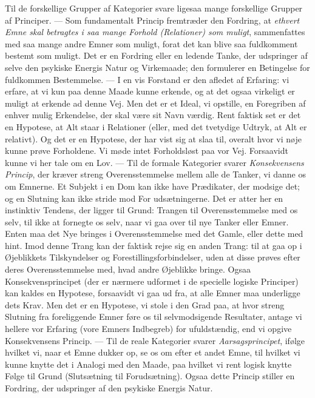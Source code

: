 \documentclass[12pt,a4paper]{book}
\newcommand{\opage}[1]{\marginnote{\footnotesize\textit{[#1]}}}
\begin{document}
Til de forskellige Grupper af Kategorier svare ligesaa mange forskellige Grupper af
Principer. --- Som fundamentalt Princip fremtræder den Fordring, at \emph{ethvert
Emne skal betragtes i saa mange Forhold (Relationer) som muligt}, sammenfattes med
saa mange andre Emner som muligt, forat det kan blive saa fuldkomment bestemt som muligt. Det er en Fordring eller en ledende Tanke, der udspringer af selve den
psykiske Energis Natur og Virkemaade; den formulerer en Betingelse for fuldkommen
Bestemmelse. --- I en vis Forstand er den afledet af Erfaring: vi erfare, at vi kun
paa denne Maade kunne erkende, og at det ogsaa virkeligt er muligt at erkende ad
denne Vej. Men det er et Ideal, vi opstille, en Foregriben af enhver mulig
Erkendelse, der skal være sit Navn værdig. Rent faktisk set er det en Hypotese, at
Alt staar i Relationer (eller, med det tvetydige Udtryk, at Alt er relativt). Og
det er en Hypotese, der har vist sig at slaa til, overalt hvor vi nøje kunne prøve
Forholdene. Vi møde intet Forholdsløst paa vor Vej. Forsaavidt kunne vi her tale om
en Lov. --- Til de formale Kategorier svarer \emph{Konsekvensens Princip}, der
kræver streng Overensstemmelse mellem alle de Tanker, vi danne os om Emnerne. Et
Subjekt i en Dom kan ikke have Prædikater, der modsige det; og en Slutning kan ikke
stride mod For%
\opage{256}udsætningerne. Det er atter her en instinktiv Tendens, der ligger til
Grund: Trangen til Overensstemmelse med os selv, til ikke at fornegte os selv, naar
vi gaa over til nye Tanker eller Emner. Enten maa det Nye bringes i
Overensstemmelse med det Gamle, eller dette med hint. Imod denne Trang kan der
faktisk rejse sig en anden Trang: til at gaa op i Øjeblikkets Tilskyndelser og
Forestillingsforbindelser, uden at disse prøves efter deres Overensstemmelse med,
hvad andre Øjeblikke bringe. Ogsaa Konsekvensprincipet (der er nærmere udformet i
de specielle logiske Principer) kan kaldes en Hypotese, forsaavidt vi gaa ud fra,
at alle Emner maa underligge dets Krav. Men det er en Hypotese, vi stole i den Grad
paa, at hvor streng Slutning fra foreliggende Emner føre os til selvmodsigende
Resultater, antage vi hellere vor Erfaring (vore Emners Indbegreb) for
ufuldstændig, end vi opgive Konsekvensens Princip. --- Til de reale Kategorier
svarer \emph{Aarsagsprincipet}, ifølge hvilket vi, naar et Emne dukker op, se os om
efter et andet Emne, til hvilket vi kunne knytte det i Analogi med den Maade, paa
hvilket vi rent logisk knytte Følge til Grund (Slutsætning til Forudsætning). Ogsaa
dette Princip stiller en Fordring, der udspringer af den psykiske Energis Natur.
\end{document}
